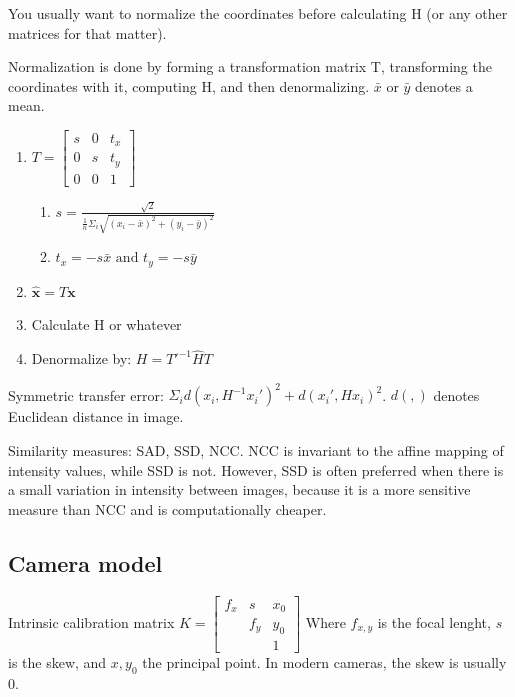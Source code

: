 You usually want to normalize the coordinates before calculating H (or any
other matrices for that matter).

Normalization is done by forming a transformation matrix T, transforming the
coordinates with it, computing H, and then denormalizing. \(\bar{x}
\text{ or } \bar{y}\) denotes a mean.

\begin{enumerate}
    \item \(T = \begin{bmatrix}
                s & 0 & t_x \\
                0 & s & t_y \\
                0 & 0 & 1
        \end{bmatrix}\)
        \begin{enumerate}
            \item \(s = \frac{\sqrt{2}}{ \frac{1}{n} \Sigma_i \sqrt{{(x_i -
                \bar{x})}^2 + {(y_i - \bar{y})}^2}}\)

            \item \(t_x = -s \bar{x} \text{ and } t_y = -s \bar{y}\)
        \end{enumerate}

    \item \( \hat{\boldsymbol{x}} = T \boldsymbol{x} \)

    \item Calculate H or whatever

    \item Denormalize by: \( H = T'^{-1} \hat{H} T\)
\end{enumerate}

Symmetric transfer error: \( \Sigma_i d{(x_i, H^{-1} x_i')}^2 + d{(x_i', H
x_i)}^2 \). \(d(,)\) denotes Euclidean distance in image.

Similarity measures: SAD, SSD, NCC\@. NCC is invariant to the affine mapping of
intensity values, while SSD is not. However, SSD is often preferred when there
is a small variation in intensity between images, because it is a more
sensitive measure than NCC and is computationally cheaper.


\subsection{Camera model}

Intrinsic calibration matrix \( K = \begin{bmatrix}
        f_x & s   & x_0 \\
            & f_y & y_0 \\
            &     & 1 
\end{bmatrix}\)
Where \(f_{x,y}\) is the focal lenght, \(s\) is the skew, and \(x,y_0\) the
principal point. In modern cameras, the skew is usually 0.

